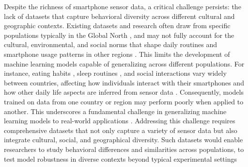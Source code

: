 Despite the richness of smartphone sensor data, a critical challenge persists: the lack of datasets that capture behavioral diversity across different cultural and geographic contexts. Existing datasets and research often draw from specific populations typically in the Global North \cite{khwaja2019modeling, meegahapola2023generalization}, and may not fully account for the cultural, environmental, and social norms that shape daily routines and smartphone usage patterns in other regions \cite{phan2022mobile}. This limits the development of machine learning models capable of generalizing across different populations. For instance, eating habits \cite{tobin2018dinner}, sleep routines \cite{stacker2023sleep, cheung2021considering}, and social interactions \cite{gsir2014social, parady2021comparative} vary widely between countries, affecting how individuals interact with their smartphones and how other daily life aspects are inferred from sensor data \cite{lopez2017self, phan2022mobile}. Consequently, models trained on data from one country or region may perform poorly when applied to another. This underscores a fundamental challenge in generalizing machine learning models to real-world applications \cite{meegahapola2023generalization, assi2023complex}. Addressing this challenge requires comprehensive datasets that not only capture a variety of sensor data but also integrate cultural, social, and geographical diversity. Such datasets would enable researchers to study behavioral differences and similarities across populations, to test model robustness in diverse contexts beyond typical experimental settings 

